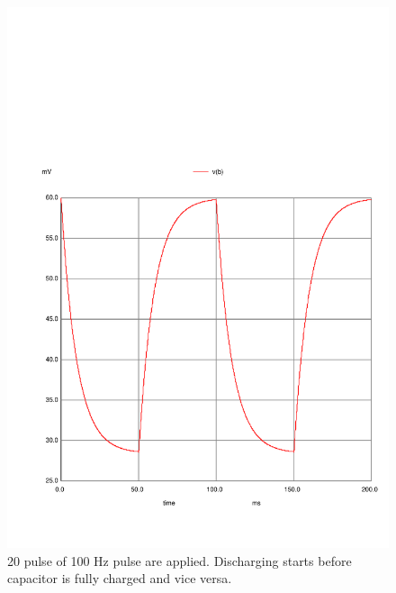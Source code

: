 \documentclass[]{article}
\begin{document}
\begin{figure}[htbp]
\centering
\includegraphics{./plot_100hz.pdf}
\caption{20 pulse of 100 Hz pulse are applied. Discharging starts before
capacitor is fully charged and vice versa.}
\end{figure}
\end{document}
